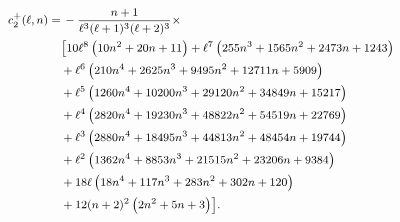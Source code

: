 \documentclass[11pt]{article}
\numberwithin{equation}{section}
\begin{document}
\begin{equation}\footnotesize
\begin{aligned}
c_2^+(\ell,n)=&\,-\frac{n+1}{\ell^3 (\ell+1)^3 (\ell+2)^3}\times\\
&\bigl[10 \ell^8 \left(10 n^2+20 n+11\right)+\ell^7 \left(255 n^3+1565 n^2+2473 n+1243\right)\\
&+\ell^6 \left(210 n^4+2625 n^3+9495 n^2+12711 n+5909\right)\\
&+\ell^5 \left(1260 n^4+10200 n^3+29120 n^2+34849 n+15217\right)\\
&+\ell^4 \left(2820 n^4+19230 n^3+48822 n^2+54519 n+22769\right)\\
&+\ell^3 \left(2880 n^4+18495 n^3+44813 n^2+48454 n+19744\right)\\
&+\ell^2 \left(1362 n^4+8853 n^3+21515 n^2+23206 n+9384\right)\\
&+18 \ell \left(18 n^4+117 n^3+283 n^2+302 n+120\right)\\
&+12 (n+2)^2 \left(2 n^2+5 n+3\right)\bigr].
\end{aligned}
\end{equation}
\end{document}
